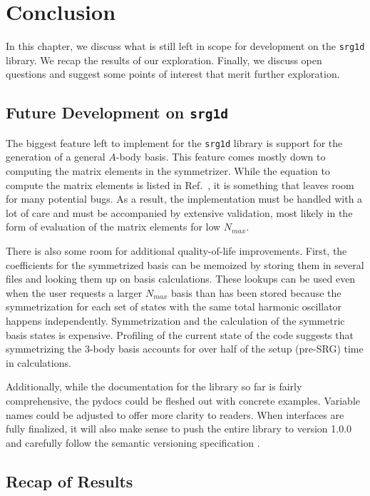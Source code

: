 \chapter{Conclusion}

In this chapter, we discuss what is still left in scope for development on the \texttt{srg1d} library. We recap the results of our exploration. Finally, we discuss open questions and suggest some points of interest that merit further exploration.

\section{Future Development on \texttt{srg1d}}

The biggest feature left to implement for the \texttt{srg1d} library is support for the generation of a general $A$-body basis. This feature comes mostly down to computing the matrix elements in the symmetrizer. While the equation to compute the matrix elements is listed in Ref.~\cite{Jurgenson:2008jp}, it is something that leaves room for many potential bugs. As a result, the implementation must be handled with a lot of care and must be accompanied by extensive validation, most likely in the form of evaluation of the matrix elements for low $N_{max}$.

There is also some room for additional quality-of-life improvements. First, the coefficients for the symmetrized basis can be memoized by storing them in several files and looking them up on basis calculations. These lookups can be used even when the user requests a larger $N_{max}$ basis than has been stored because the symmetrization for each set of states with the same total harmonic oscillator happens independently. Symmetrization and the calculation of the symmetric basis states is expensive. Profiling of the current state of the code suggests that symmetrizing the 3-body basis accounts for over half of the setup (pre-SRG) time in calculations.

Additionally, while the documentation for the library so far is fairly comprehensive, the pydocs could be fleshed out with concrete examples. Variable names could be adjusted to offer more clarity to readers. When interfaces are fully finalized, it will also make sense to push the entire library to version 1.0.0 and carefully follow the semantic versioning specification \cite{semver}.

\section{Recap of Results}

